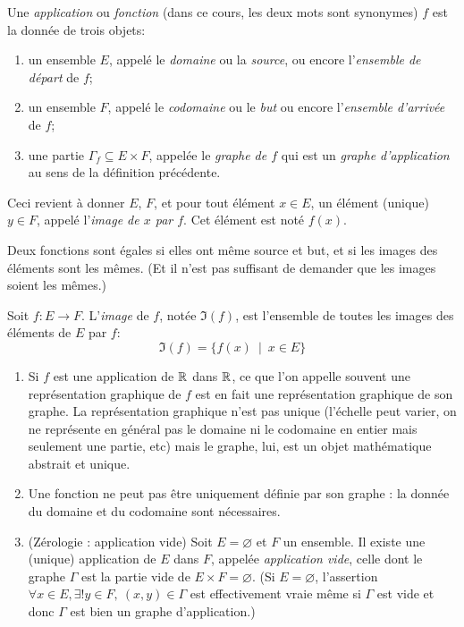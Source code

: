 \begin{definition}
Une \emph{application} ou \emph{fonction} (dans ce cours, les deux mots sont synonymes) $f$ est la donnée de trois objets:
\begin{enumerate}
\item un ensemble $E$, appelé le \emph{domaine} ou la \emph{source}, ou encore l'\emph{ensemble de départ} de $f$;
\item un ensemble $F$, appelé le \emph{codomaine} ou le \emph{but} ou encore l'\emph{ensemble d'arrivée} de $f$;
\item une partie $\Gamma_f \subseteq E\times F$, appelée le \emph{graphe de $f$} qui est un \emph{graphe d'application} au sens de la définition précédente. 
\end{enumerate}
Ceci revient à donner $E$, $F$, et pour tout élément $x \in E$, un élément (unique) $y\in F$, appelé l'\emph{image de $x$ par $f$}. Cet élément est noté $f(x)$.
\end{definition}

Deux fonctions sont égales si elles ont même source et but, et si les images des éléments sont les mêmes. (Et il n'est pas suffisant de demander que les images soient les mêmes.)

\begin{definition}
Soit $f : E\to F$. L'\emph{image} de $f$, notée $\Im(f)$, est l'ensemble de toutes les images des éléments de $E$ par $f$:
\[
\Im(f) = \{f(x)\:\mid\: x\in E\}
\]
\end{definition}

\begin{remarque}
\begin{enumerate}
\item Si $f$ est une application de $\mathbb{R}$ dans $\mathbb{R}$, ce que l'on appelle souvent une \og représentation graphique de $f$\fg{} est en fait une représentation graphique de son graphe. La représentation graphique n'est pas unique (l'échelle peut varier, on ne représente en général pas le domaine ni le codomaine en entier mais seulement une partie, etc) mais le graphe, lui, est un objet mathématique abstrait et unique.
\item Une fonction ne peut pas être uniquement définie par son graphe : la donnée du domaine et du codomaine sont nécessaires.
\item {} (Zérologie : application vide) Soit $E = \varnothing$ et $F$ un ensemble. Il existe une (unique) application de $E$ dans $F$, appelée \emph{application vide}, celle dont le graphe $\Gamma$ est la partie vide de $E\times F = \varnothing$. (Si $E=\varnothing$,  l'assertion \og $\forall x\in E, \exists! y\in F,\: (x,y)\in \Gamma$\fg{} est effectivement vraie même si $\Gamma$ est vide et donc $\Gamma$ est bien un graphe d'application.)
\end{enumerate}
\end{remarque}

